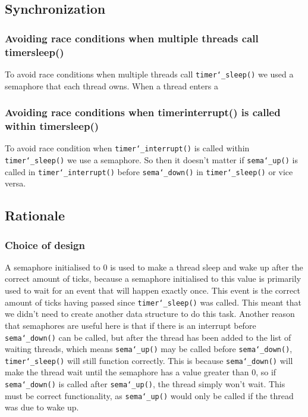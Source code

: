 \documentclass{article}
\renewcommand{\_}{\char`_}
\begin{document}
\subsection{Synchronization}
\subsubsection{Avoiding race conditions when multiple threads call timer\textunderscore sleep()}
To avoid race conditions when multiple threads call \texttt{timer\_sleep()} we used a semaphore that each thread owns. When a thread
enters a 
\subsubsection{Avoiding race conditions when timer\textunderscore interrupt() is called within timer\textunderscore sleep()}
To avoid race condition when \texttt{timer\_interrupt()} is called within \texttt{timer\_sleep()} we use a semaphore. So then it doesn't 
matter if \texttt{sema\_up()} is called in \texttt{timer\_interrupt()} before \texttt{sema\_down()} in \texttt{timer\_sleep()} or vice versa.
\subsection{Rationale}

\subsubsection{Choice of design}

A semaphore initialised to 0 is used to make a thread sleep and wake up after the correct amount of ticks, because a semaphore initialised to this value is primarily used to wait for an event that will happen exactly once. This event is the correct amount of ticks having passed since \texttt{timer\_sleep()} was called. This meant that we didn't need to create another data structure to do this task. Another reason that semaphores are useful here is that if there is an interrupt before \texttt{sema\_down()} can be called, but after the thread has been added to the list of waiting threads, which means \texttt{sema\_up()} may be called before \texttt{sema\_down()}, \texttt{timer\_sleep()} will still function correctly. This is because \texttt{sema\_down()} will make the thread wait until the semaphore has a value greater than 0, so if \texttt{sema\_down()} is called after \texttt{sema\_up()}, the thread simply won't wait. This must be correct functionality, as \texttt{sema\_up()} would only be called if the thread was due to wake up.
\end{document}
